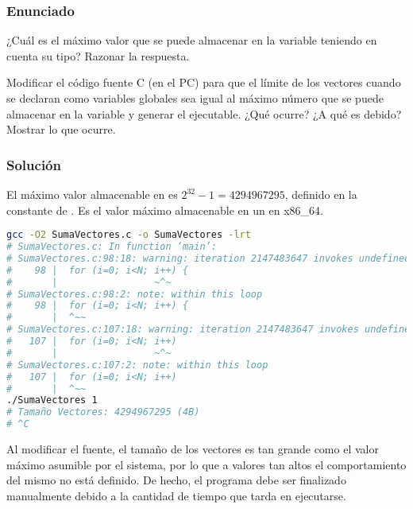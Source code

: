 \subsubsection{Enunciado}

¿Cuál es el máximo valor que se puede almacenar en la variable  teniendo en cuenta su tipo?
Razonar la respuesta.

Modificar el código fuente C (en el PC) para que el límite de los vectores cuando se declaran como variables globales sea igual al máximo número que se puede almacenar en la variable  y generar el ejecutable.
¿Qué ocurre?
¿A qué es debido?
Mostrar lo que ocurre.

\pagebreak

\subsubsection{Solución}

El máximo valor almacenable en  es $2^{32}-1 = 4294967295$, definido en la constante  de .
Es el valor máximo almacenable en un  en x86\_64.

\begin{lstlisting}[language=sh]
gcc -O2 SumaVectores.c -o SumaVectores -lrt
# SumaVectores.c: In function ‘main’:
# SumaVectores.c:98:18: warning: iteration 2147483647 invokes undefined behavior [-Waggressive-loop-optimizations]
#    98 |  for (i=0; i<N; i++) {
#       |                 ~^~
# SumaVectores.c:98:2: note: within this loop
#    98 |  for (i=0; i<N; i++) {
#       |  ^~~
# SumaVectores.c:107:18: warning: iteration 2147483647 invokes undefined behavior [-Waggressive-loop-optimizations]
#   107 |  for (i=0; i<N; i++)
#       |                 ~^~
# SumaVectores.c:107:2: note: within this loop
#   107 |  for (i=0; i<N; i++)
#       |  ^~~
./SumaVectores 1
# Tamaño Vectores: 4294967295 (4B)
# ^C
\end{lstlisting}

Al modificar el fuente, el tamaño de los vectores es tan grande como el valor máximo asumible por el sistema, por lo que a valores tan altos el comportamiento del mismo no está definido.
De hecho, el programa debe ser finalizado manualmente debido a la cantidad de tiempo que tarda en ejecutarse.
